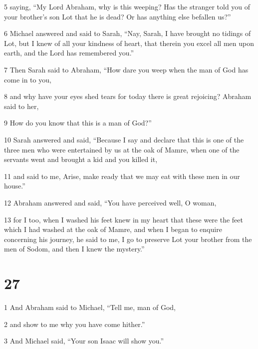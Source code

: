 \par 5 saying, “My Lord Abraham, why is this weeping? Has the stranger told you of your brother's son Lot that he is dead? Or has anything else befallen us?” 

\par 6 Michael answered and said to Sarah, “Nay, Sarah, I have brought no tidings of Lot, but I knew of all your kindness of heart, that therein you excel all men upon earth, and the Lord has remembered you.” 

\par 7 Then Sarah said to Abraham, “How dare you weep when the man of God has come in to you, 

\par 8 and why have your eyes shed tears for today there is great rejoicing? Abraham said to her, 

\par 9 How do you know that this is a man of God?” 

\par 10 Sarah answered and said, “Because I say and declare that this is one of the three men who were entertained by us at the oak of Mamre, when one of the servants went and brought a kid and you killed it, 

\par 11 and said to me, Arise, make ready that we may eat with these men in our house.” 

\par 12 Abraham answered and said, “You have perceived well, O woman, 

\par 13 for I too, when I washed his feet knew in my heart that these were the feet which I had washed at the oak of Mamre, and when I began to enquire concerning his journey, he said to me, I go to preserve Lot your brother from the men of Sodom, and then I knew the mystery.”


\chapter{27}

\par 1 And Abraham said to Michael, “Tell me, man of God, 

\par 2 and show to me why you have come hither.” 

\par 3 And Michael said, “Your son Isaac will show you.” 

